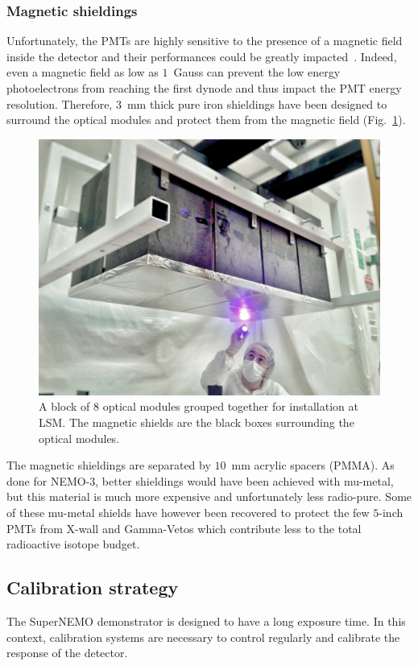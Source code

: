 \subsubsection*{Magnetic shieldings}

Unfortunately, the PMTs are highly sensitive to the presence of a magnetic field inside the detector and their performances could be greatly impacted~\cite{CalvezThesis}\cite{internal:magnetic_field}.
Indeed, even a magnetic field as low as $1$~Gauss can prevent the low energy photoelectrons from reaching the first dynode and thus impact the PMT energy resolution.
Therefore, $3$~mm thick pure iron shieldings have been designed to surround the optical modules and protect them from the magnetic field (Fig.~\ref{fig:magnetic_shields}).
\begin{figure}[h!]
\centering
\includegraphics[height=0.5\textwidth]{SNdemonstrator/fig_SNdemonstrator/magnetic_shields.jpg}
\caption{A block of $8$ optical modules grouped together for installation at LSM.
  The magnetic shields are the black boxes surrounding the optical modules.
\label{fig:magnetic_shields}}
\end{figure}
The magnetic shieldings are separated by $10$~mm acrylic spacers (PMMA).
As done for NEMO-$3$, better shieldings would have been achieved with mu-metal, but this material is much more expensive and unfortunately less radio-pure.
Some of these mu-metal shields have however been recovered to protect the few $5$-inch PMTs from X-wall and Gamma-Vetos which contribute less to the total radioactive isotope budget.


\subsection{Calibration strategy}
\label{subsec:calib}

The SuperNEMO demonstrator is designed to have a long exposure time.
In this context, calibration systems are necessary to control regularly and calibrate the response of the detector.


